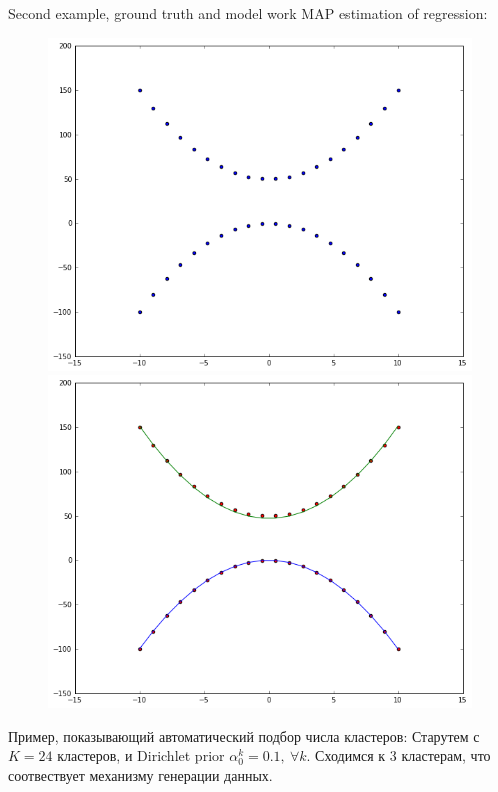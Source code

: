 Second example, ground truth and model work MAP estimation of regression:
\begin{figure}[H]
   \centering
   \includegraphics[scale=0.15]{figures/parabals_ground_trough.png}
   \includegraphics[scale=0.15]{figures/parabals_mixture.png}
 \end{figure}

Пример, показывающий автоматический подбор числа кластеров:
Старутем с  $K=24$ кластеров, и Dirichlet prior $\alpha_0^k = 0.1,~\forall k$. Сходимся к 3 кластерам, что соотвествует механизму генерации данных.

